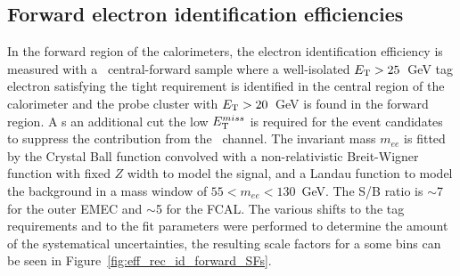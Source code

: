 \begin{figure}
\end{figure}

\subsection{Forward electron identification efficiencies}

In the forward region of the calorimeters, the electron identification efficiency is measured with a \Zee\ central-forward sample  where  a  well-isolated $E_{\mathrm{T}} > 25$~GeV tag  electron satisfying the tight requirement is identified in the central region of the calorimeter and the probe cluster with $E_{\mathrm{T}} > 20$~GeV is found in the forward region. A s an additional cut the low $E_{\mathrm{T}}^{miss}$ is required for the event candidates to suppress the contribution from the \Wenu\ channel.
The invariant mass $m_{ee}$ is fitted by the Crystal Ball function convolved with a non-relativistic Breit-Wigner function with fixed $Z$ width to model the signal, and a Landau function to model the background in a mass window of $55 < m_{ee} < 130$~GeV. The S/B ratio is $\sim$7 for the outer EMEC and $\sim$5 for the FCAL. The various shifts to the tag requirements and to the fit parameters were performed to determine the amount of the systematical uncertainties, the resulting scale factors for a some bins can be seen in Figure~\ref{fig:eff_rec_id_forward_SFs}.

